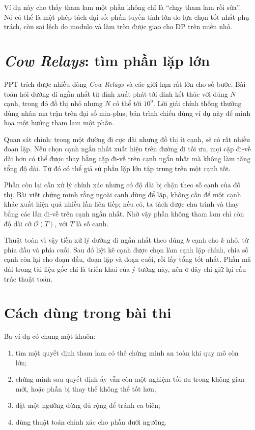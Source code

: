 \documentclass[11pt]{article}
\newcommand{\Oh}{\mathcal{O}}
\begin{document}
Ví dụ này cho thấy tham lam một phần không chỉ là ``chạy tham lam rồi sửa''.
Nó có thể là một phép tách đại số: phần tuyến tính lớn do lựa chọn tốt nhất
phụ trách, còn sai lệch do modulo và làm tròn được giao cho DP trên miền nhỏ.

\section{\textit{Cow Relays}: tìm phần lặp lớn}

PPT trích được nhiều dòng \textit{Cow Relays} và các giới hạn rất lớn cho số
bước. Bài toán hỏi đường đi ngắn nhất từ đỉnh xuất phát tới đỉnh kết thúc với
đúng \(N\) cạnh, trong đó đồ thị nhỏ nhưng \(N\) có thể tới \(10^9\). Lời
giải chính thống thường dùng nhân ma trận trên đại số min-plus; bản trình
chiếu dùng ví dụ này để minh họa một hướng tham lam một phần.

Quan sát chính: trong một đường đi cực dài nhưng đồ thị ít cạnh, sẽ có rất
nhiều đoạn lặp. Nếu chọn cạnh ngắn nhất xuất hiện trên đường đi tối ưu, mọi
cặp đi-về dài hơn có thể được thay bằng cặp đi-về trên cạnh ngắn nhất mà
không làm tăng tổng độ dài. Từ đó có thể giả sử phần lặp lớn tập trung trên
một cạnh tốt.

Phần còn lại cần xử lý chính xác nhưng có độ dài bị chặn theo số cạnh của đồ
thị. Bài viết chứng minh rằng ngoài cạnh dùng để lặp, không cần để một cạnh
khác xuất hiện quá nhiều lần liên tiếp; nếu có, ta tách được chu trình và
thay bằng các lần đi-về trên cạnh ngắn nhất. Nhờ vậy phần không tham lam chỉ
còn độ dài cỡ \(\Oh(T)\), với \(T\) là số cạnh.

Thuật toán vì vậy tiền xử lý đường đi ngắn nhất theo đúng \(k\) cạnh cho
\(k\) nhỏ, từ phía đầu và phía cuối. Sau đó liệt kê cạnh được chọn làm cạnh
lặp chính, chia số cạnh còn lại cho đoạn đầu, đoạn lặp và đoạn cuối, rồi lấy
tổng tốt nhất. Phần mã dài trong tài liệu gốc chỉ là triển khai của ý tưởng
này, nên ở đây chỉ giữ lại cấu trúc thuật toán.

\section{Cách dùng trong bài thi}

Ba ví dụ có chung một khuôn:
\begin{enumerate}
  \item tìm một quyết định tham lam có thể chứng minh an toàn khi quy mô còn
  lớn;
  \item chứng minh sau quyết định ấy vẫn còn một nghiệm tối ưu trong không
  gian mới, hoặc phần bị thay thế không thể tốt hơn;
  \item đặt một ngưỡng dừng đủ rộng để tránh ca biên;
  \item dùng thuật toán chính xác cho phần dưới ngưỡng.
\end{enumerate}
\end{document}
